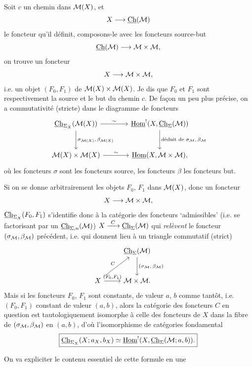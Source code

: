 Soit $c$ un chemin dans $\mathcal{M}(X)$, et
\[
X\longrightarrow\underline{\mathrm{Ch}}(\mathcal{M})
\]
le foncteur qu'il définit, composons-le avec les foncteurs source-but
\[
\underline{\mathrm{Ch}}(\mathcal{M})\longrightarrow\mathcal{M}\times\mathcal{M},
\]
on trouve un foncteur
\[
X\longrightarrow\mathcal{M}\times\mathcal{M},
\]
i.e. un objet $(F_0,F_1)$ de $\mathcal{M}(X)\times\mathcal{M}(X)$. Je dis que $F_0$ et $F_1$ sont respectivement la source et le but du chemin $c$. De façon un peu plus précise, on a commutativité (stricte) dans le diagramme de foncteurs
\[
\begin{tikzcd}[column sep=large, row sep=large]
\Ch_{\Sigma_X}(\cM(X)) \arrow[r, "\sim"] \arrow[d, "{\sigma_{\cM(X)},\,\beta_{\cM(X)}}"] & \uHom^{!}(X,\Ch_{\Sigma}(\cM)) \arrow[d, "{\text{déduit de }\sigma_{\cM},\,\beta_{\cM}}"] \\
\cM(X)\times\cM(X) \arrow[r, "\sim"] & \uHom(X,\cM\times\cM),
\end{tikzcd}
\]
où les foncteurs $\sigma$ sont les foncteurs source, les foncteurs $\beta$ les foncteurs but.

Si on se donne arbitrairement les objets $F_0$, $F_1$ dans $\mathcal{M}(X)$, donc un foncteur
\[
X\longrightarrow\mathcal{M}\times\mathcal{M},
\]
$\underline{\mathrm{Ch}}_{\Sigma_X}(F_0,F_1)$ s'identifie donc à la catégorie des foncteurs ‘admissibles’ (i.e. se factorisant par un $\underline{\mathrm{Ch}}_{\Sigma,n}(\mathcal{M})$) $X\xrightarrow{\ C\ }\underline{\mathrm{Ch}}_{\Sigma}(\mathcal{M})$ qui \textit{relèvent}
le foncteur $(\sigma_{\mathcal{M}},\beta_{\mathcal{M}})$ précédent, i.e. qui donnent lieu à un triangle commutatif (strict)
\[
\begin{tikzcd}[row sep=large]
 & \Ch_{\Sigma}(\cM) \arrow[d, "{(\sigma_{\cM},\,\beta_{\cM})}"] \\
X \arrow[ur, "C"] \arrow[r, "{(F_0,F_1)}"] & \cM\times\cM.
\end{tikzcd}
\]
Mais si les foncteurs $F_0$, $F_1$ sont constants, de valeur $a$, $b$ comme tantôt, i.e. $(F_0,F_1)$ constant de valeur $(a,b)$, alors la catégorie des foncteurs $C$ en question est tautologiquement isomorphe à celle des foncteurs de $X$ dans la fibre de $(\sigma_{\mathcal{M}},\beta_{\mathcal{M}})$ en $(a,b)$, d'où l'isomorphisme de catégories fondamental
\[
\boxed{\underline{\mathrm{Ch}}_{\Sigma_X}(X;a_X,b_X)\simeq\underline{\mathrm{Hom}}^{!}(X,\underline{\mathrm{Ch}}_{\Sigma}(\mathcal{M};a,b)).}
\]

On va expliciter le contenu essentiel de cette formule en une

